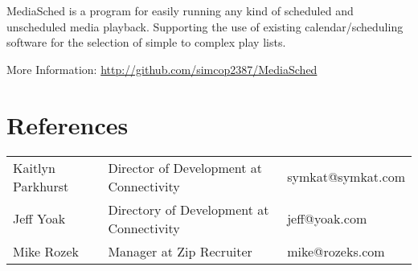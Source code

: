 \documentclass[table,tmargin=1in,bmargin=1in,letterpaper]{resume}
\begin{document}

\begin{compactitem}
\item MediaSched is a program for easily running any kind of scheduled and unscheduled media playback.  Supporting the use of existing calendar/scheduling software for the selection of simple to complex play lists.
\item More Information: \url{http://github.com/simcop2387/MediaSched}
\end{compactitem}

\section{References}
\begin{tabular}{lll}
\rowcolor{white} Kaitlyn Parkhurst & Director of Development at Connectivity & symkat@symkat.com \\
\rowcolor{lightgray} Jeff Yoak & Directory of Development at Connectivity & jeff@yoak.com \\
\rowcolor{white} Mike Rozek & Manager at Zip Recruiter & mike@rozeks.com
\end{tabular}
\end{document}

